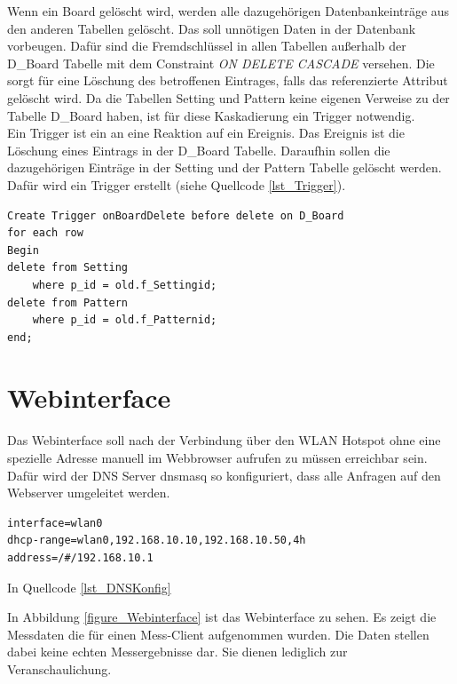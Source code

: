 Wenn ein Board gelöscht wird, werden alle dazugehörigen Datenbankeinträge aus den anderen Tabellen gelöscht. Das soll unnötigen Daten in der Datenbank vorbeugen. Dafür sind die Fremdschlüssel in allen Tabellen außerhalb der D\_Board Tabelle mit dem Constraint \textit{ON DELETE CASCADE} versehen. Die sorgt für eine Löschung des betroffenen Eintrages, falls das referenzierte Attribut gelöscht wird. Da die Tabellen Setting und Pattern keine eigenen Verweise zu der Tabelle D\_Board haben, ist für diese Kaskadierung ein Trigger notwendig. \\
Ein Trigger ist ein an eine Reaktion auf ein Ereignis. Das Ereignis ist die Löschung eines Eintrags in der D\_Board Tabelle. Daraufhin sollen die dazugehörigen Einträge in der Setting und der Pattern Tabelle gelöscht werden. Dafür wird ein Trigger erstellt (siehe Quellcode \ref{lst_Trigger}).\\

\begin{lstlisting}[caption={onBoardDelete Trigger},label=lst_Trigger]
Create Trigger onBoardDelete before delete on D_Board 
for each row 
Begin 
delete from Setting 
	where p_id = old.f_Settingid;
delete from Pattern 
	where p_id = old.f_Patternid;
end;
\end{lstlisting}



\newpage
\section{Webinterface}

Das Webinterface soll nach der Verbindung über den WLAN Hotspot ohne eine spezielle Adresse manuell im Webbrowser aufrufen zu müssen erreichbar sein. Dafür wird der DNS Server dnsmasq so konfiguriert, dass alle Anfragen auf den Webserver umgeleitet werden.

\begin{lstlisting}[caption={DHCP/DNS Konfiguration},label=lst_DNSKonfig]
interface=wlan0
dhcp-range=wlan0,192.168.10.10,192.168.10.50,4h
address=/#/192.168.10.1
\end{lstlisting}

In Quellcode \ref{lst_DNSKonfig}


In Abbildung \ref{figure_Webinterface} ist das Webinterface zu sehen. Es zeigt die Messdaten die für einen Mess-Client aufgenommen wurden. Die Daten stellen dabei keine echten Messergebnisse dar. Sie dienen lediglich zur Veranschaulichung.

